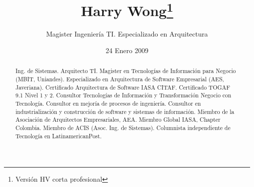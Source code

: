 \documentclass{tufte-handout}
\title{Harry Wong\thanks{Versión HV corta profesional}}
\author[Magister Ingeniería TI. Especializado en Arquitectura]{Magister
Ingeniería TI. Especializado en Arquitectura}
\date{24 Enero 2009}  %
\begin{document}
\maketitle %



\begin{abstract}
    
\noindent Ing. de Sistemas. Arquitecto TI. Magister en Tecnologías de
Información para Negocio (MBIT, Uniandes). Especializado en Arquitectura
de Software Empresarial (AES, Javeriana). Certificado Arquitectura de
Software IASA CITAF. Certificado TOGAF 9.1 Nivel 1 y 2. Consultor
Tecnologías de Información y Transformación Negocio con Tecnología.
Consultor en mejoría de procesos de ingeniería. Consultor en
industrialización y construcción de software y sistemas de información.
Miembro de la Asociación de Arquitectos Empresariales, AEA. Miembro
Global IASA, Chapter Colombia. Miembro de ACIS (Asoc. Ing. de Sistemas).
Columnista independiente de Tecnología en LatinamericanPost.
\end{abstract}
  
\end{document}
